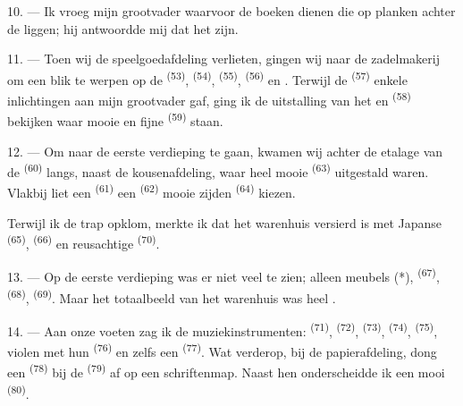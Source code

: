 10. --- Ik vroeg mijn grootvader waarvoor de boeken dienen die op planken achter de
 liggen; hij antwoordde mij dat het  zijn.

\VUsaut{3.6mm}
\VUsaut{2.8mm}

11. --- Toen wij de speelgoedafdeling verlieten, gingen wij naar de zadelmakerij om een blik
te werpen op de  \textsuperscript{(53)},
 \textsuperscript{(54)}, 
\textsuperscript{(55)},  \textsuperscript{(56)} en
. Terwijl de  \textsuperscript{(57)}
enkele inlichtingen aan mijn grootvader gaf, ging ik de uitstalling van het
 en  \textsuperscript{(58)} bekijken waar mooie
 en fijne  \textsuperscript{(59)} staan.

12. --- Om naar de eerste verdieping te gaan, kwamen wij achter de etalage van de
 \textsuperscript{(60)} langs, naast de kousenafdeling, waar heel mooie
 \textsuperscript{(63)} uitgestald waren. Vlakbij liet een
 \textsuperscript{(61)} een
 \textsuperscript{(62)} mooie zijden 
\textsuperscript{(64)} kiezen.

Terwijl ik de trap opklom, merkte ik dat het warenhuis versierd is met Japanse
 \textsuperscript{(65)}, 
\textsuperscript{(66)} en reusachtige  \textsuperscript{(70)}.

13. --- Op de eerste verdieping was er niet veel te zien; alleen meubels (*),
 \textsuperscript{(67)}, 
\textsuperscript{(68)},  \textsuperscript{(69)}. Maar het totaalbeeld van
het warenhuis was heel .

14. --- Aan onze voeten zag ik de muziekinstrumenten:  \textsuperscript{(71)},
 \textsuperscript{(72)},
 \textsuperscript{(73)}, 
\textsuperscript{(74)},  \textsuperscript{(75)}, violen met hun
 \textsuperscript{(76)} en zelfs een 
\textsuperscript{(77)}. Wat verderop, bij de papierafdeling, dong een
 \textsuperscript{(78)} bij de 
\textsuperscript{(79)} af op een schriftenmap. Naast hen onderscheidde ik een mooi
 \textsuperscript{(80)}.

